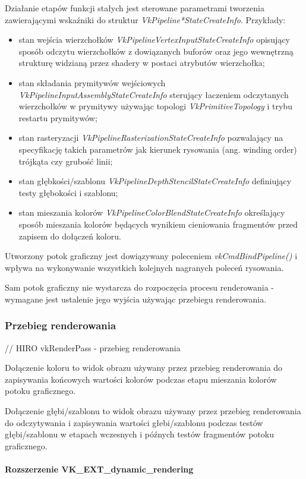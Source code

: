Działanie etapów funkcji stałych jest sterowane parametrami tworzenia zawierającymi wskaźniki do struktur \textit{VkPipeline*StateCreateInfo}.
Przykłady:
\begin{itemize}
\item stan wejścia wierzchołków \textit{VkPipelineVertexInputStateCreateInfo} opisujący sposób odczytu wierzchołków z dowiązanych buforów oraz jego wewnętrzną strukturę widzianą przez shadery w postaci atrybutów wierzchołka;
\item stan składania prymitywów wejściowych \textit{VkPipelineInputAssemblyStateCreateInfo} sterujący łaczeniem odczytanych wierzchołków w prymitywy używając topologi \textit{VkPrimitiveTopology} i trybu restartu prymitywów;
\item stan rasteryzacji \textit{VkPipelineRasterizationStateCreateInfo} pozwalający na specyfikację takich parametrów jak kierunek rysowania (ang. winding order) trójkąta czy grubość linii;
\item stan głębkości/szablonu \textit{VkPipelineDepthStencilStateCreateInfo} definiujący testy głębokości i szablonu;
\item stan mieszania kolorów \textit{VkPipelineColorBlendStateCreateInfo} określający sposób mieszania kolorów będących wynikiem cieniowania fragmentów przed zapisem do dołączeń koloru.
\end{itemize}

Utworzony potok graficzny jest dowiązywany poleceniem \textit{vkCmdBindPipeline()} i wpływa na wykonywanie wszystkich kolejnych nagranych poleceń rysowania.

Sam potok graficzny nie wystarcza do rozpoczęcia procesu renderowania - wymagane jest ustalenie jego wyjścia używając przebiegu renderowania.


\subsubsection {Przebieg renderowania}
// HIRO vkRenderPass - przebieg renderowania

Dołączenie koloru to widok obrazu używany przez przebieg renderowania do zapisywania końcowych wartości kolorów podczas etapu mieszania kolorów potoku graficznego.

Dołączenie głębi/szablonu to widok obrazu używany przez przebieg renderowania do odczytywania i zapisywania wartości głebi/szablonu podczas testów głębi/szablonu w etapach wczesnych i późnych testów fragmentów potoku graficznego.

\paragraph{Rozszerzenie VK\_EXT\_dynamic\_rendering}

